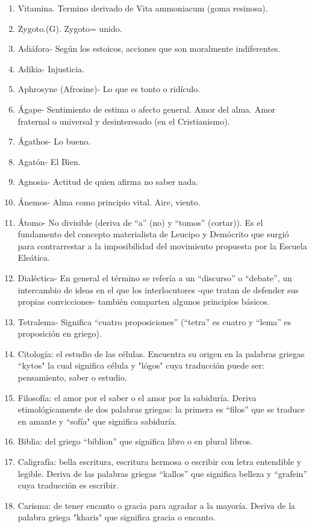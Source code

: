 \documentclass{mylib/reporte}
\begin{document}
\begin{enumerate}
	\item Vitamina. Termino derivado de Vita ammoniacum (goma resinosa).
	\item Zygoto.(G). Zygoto= unido.
	\item Adiáfora- Según los estoicos, acciones que son moralmente indiferentes.
	\item Adikia- Injusticia.
	\item Aphrosyne (Afrosine)- Lo que es tonto o ridículo.
	\item Ágape- Sentimiento de estima o afecto general. Amor del alma. Amor fraternal o universal y desinteresado (en el Cristianismo).
	\item Ágathos- Lo bueno.
	\item Agatón- El Bien.
	\item Agnosia- Actitud de quien afirma no saber nada.
	\item Ánemos- Alma como principio vital. Aire, viento.
	\item Átomo- No divisible (deriva de “a” (no) y “tomos” (cortar)). Es el fundamento del concepto materialista de Leucipo y Demócrito que surgió para contrarrestar a la imposibilidad del movimiento propuesta por la Escuela Eleática.
	\item Dialéctica- En general el término se refería a un “discurso” o “debate”, un intercambio de ideas en el que los interlocutores -que tratan de defender sus propias convicciones- también comparten algunos principios básicos.
	\item Tetralema- Significa “cuatro proposiciones” (“tetra” es cuatro y “lema” es proposición en griego).
	\item Citología: el estudio de las células. Encuentra su origen en la palabras griegas “kytos" la cual significa célula y "lógos" cuya traducción puede ser: pensamiento, saber o estudio.
	\item Filosofía: el amor por el saber o el amor por la sabiduría. Deriva etimológicamente de dos palabras griegas: la primera es “filos” que se traduce en amante y “sofía" que significa sabiduría.
	\item Biblia: del griego “biblion” que significa libro o en plural libros.
	\item Caligrafía: bella escritura, escritura hermosa o escribir con letra entendible y legible. Deriva de las palabras griegas “kallos” que significa belleza y “grafein” cuya traducción es escribir.
	\item Carisma: de tener encanto o gracia para agradar a la mayoría. Deriva de la palabra griega "kharis" que significa gracia o encanto.

\end{enumerate}
\end{document}
